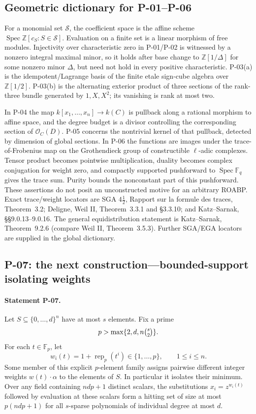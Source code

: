 \documentclass[11pt,a4paper]{article}
\theoremstyle{definition}\newtheorem{definition}{Definition}
\begin{document}
\subsection{Geometric dictionary for P-01--P-06}
For a monomial set $\mathcal S$, the coefficient space is the affine scheme $\operatorname{Spec}\mathbb Z[c_S:S\in\mathcal S]$. Evaluation on a finite set is a linear morphism of free modules. Injectivity over characteristic zero in P-01/P-02 is witnessed by a nonzero integral maximal minor, so it holds after base change to $\mathbb Z[1/\Delta]$ for some nonzero minor $\Delta$, but need not hold in every positive characteristic. P-03(a) is the idempotent/Lagrange basis of the finite etale sign-cube algebra over $\mathbb Z[1/2]$. P-03(b) is the alternating exterior product of three sections of the rank-three bundle generated by $1,X,X^2$; its vanishing is rank at most two.

In P-04 the map $k[x_1,\ldots,x_n]\to k(C)$ is pullback along a rational morphism to affine space, and the degree budget is a divisor controlling the corresponding section of $\mathcal O_C(D)$. P-05 concerns the nontrivial kernel of that pullback, detected by dimension of global sections. In P-06 the functions are images under the trace-of-Frobenius map on the Grothendieck group of constructible $\ell$-adic complexes. Tensor product becomes pointwise multiplication, duality becomes complex conjugation for weight zero, and compactly supported pushforward to $\operatorname{Spec}\mathbb F_q$ gives the trace sum. Purity bounds the nonconstant part of this pushforward. These assertions do not posit an unconstructed motive for an arbitrary ROABP. Exact trace/weight locators are SGA $4\frac12$, Rapport sur la formule des traces, Theorem~3.2; Deligne, Weil II, Theorem~3.3.1 and \S3.3.10; and Katz--Sarnak, \S\S9.0.13--9.0.16. The general equidistribution statement is Katz--Sarnak, Theorem~9.2.6 (compare Weil II, Theorem~3.5.3). Further SGA/EGA locators are supplied in the global dictionary.

\subsection{P-07: the next construction---bounded-support isolating weights}
\paragraph{Statement P-07.}
Let $S\subseteq\{0,\ldots,d\}^n$ have at most $s$ elements. Fix a prime
\[
 p>\max\{2,d,n\tbinom{s}{2}\}.
\]
For each $t\in\mathbb F_p$, let
\[
 w_i(t)=1+\operatorname{rep}_p(t^i)\in\{1,\ldots,p\},\qquad 1\le i\le n.
\]
Some member of this explicit $p$-element family assigns pairwise different integer weights $w(t)\cdot\alpha$ to the elements of $S$. In particular it isolates their minimum. Over any field containing $ndp+1$ distinct scalars, the substitutions $x_i=z^{w_i(t)}$ followed by evaluation at these scalars form a hitting set of size at most $p(ndp+1)$ for all $s$-sparse polynomials of individual degree at most $d$.
\end{document}
